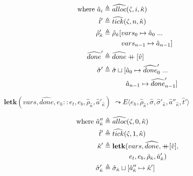 \documentclass[12pt,draft]{article}
\newcommand\mdoubleplus{\ensuremath{\mathbin{+\mkern-9mu+}}}
\begin{document}
\begin{multicols*}{2}
\begin{align*}
  \text{where } \hat{a}_i &\triangleq \widehat{alloc}(\hat{\varsigma}, i, \hat{\kappa}) \\
  \hat{t}' &\triangleq \widehat{tick}(\hat{\varsigma}, n, \hat{\kappa}) \\
  \hat{\rho}'_{\hat{\kappa}} &\triangleq \hat{\rho}_{\hat{\kappa}}[vars_0 \mapsto \hat{a}_0\;...\\
  &\;\;\;\;\;\;\;\;\;\,  vars_{n-1} \mapsto \hat{a}_{n-1}] \\
  \widehat{done}' &\triangleq \widehat{done} \mdoubleplus [\hat{v}] \\
  \hat{\sigma}' &\triangleq \hat{\sigma} \sqcup [\hat{a}_0 \mapsto \widehat{done}'_0\;...\\
  &\;\;\;\;\;\;\;\;\;\;\;\; \hat{a}_{n-1} \mapsto \widehat{done}'_{n-1}]
\end{align*}
\begin{center}
  $\textbf{letk}(vars, \widehat{done}, e_h::e_t , e_b , \hat{\rho}_{\hat{\kappa}}, \hat{a}'_{\hat{\kappa}})$
  $\leadsto E\langle e_h , \hat{\rho}_{\hat{\kappa}} , \hat{\sigma} , \hat{\sigma}'_{\hat{\kappa}} , \hat{a}''_{\hat{\kappa}} , \hat{t}'\rangle$
\end{center}
\vspace{-7mm}
\begin{align*}
  \text{where } \hat{a}''_{\hat{\kappa}} &\triangleq \widehat{alloc}(\hat{\varsigma}, 0, \hat{\kappa}) \\
  \hat{t}' &\triangleq \widehat{tick}(\hat{\varsigma}, 1, \hat{\kappa}) \\
  \hat{\kappa}' &\triangleq \textbf{letk}(vars, \widehat{done}, \mdoubleplus [\hat{v}],\\
  &\;\;\;\;\;\;\;\;\;\;\;\;\;\, e_t , e_b , \hat{\rho}_{\hat{\kappa}} , \hat{a}'_{\hat{\kappa}}) \\
  \hat{\sigma}'_{\hat{\kappa}} &\triangleq \hat{\sigma}_{\hat{\kappa}} \sqcup [\hat{a}''_{\hat{\kappa}} \mapsto \hat{\kappa}']
\end{align*}

\vfill\null
\columnbreak



\end{multicols*}
\end{document}
